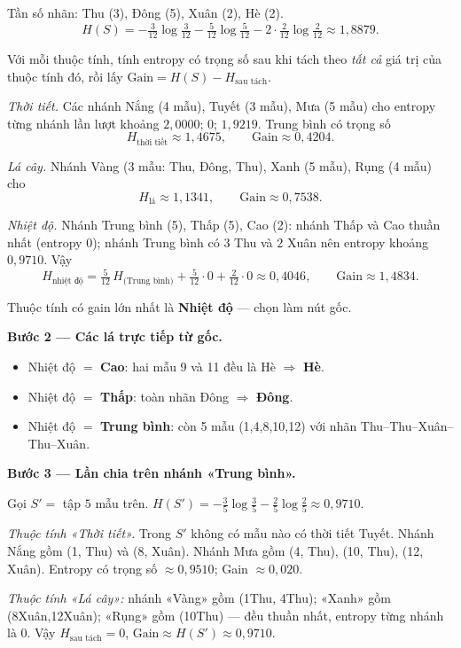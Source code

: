Tần số nhãn: Thu (3), Đông (5), Xuân (2), Hè (2).
\[
H(S)= -\tfrac{3}{12}\log\tfrac{3}{12}-\tfrac{5}{12}\log\tfrac{5}{12}
      -2\cdot\tfrac{2}{12}\log\tfrac{2}{12}
      \approx 1{,}8879.
\]

Với mỗi thuộc tính, tính entropy có trọng số sau khi tách theo \emph{tất cả} giá trị của thuộc tính đó, rồi lấy \(\text{Gain}=H(S)-H_{\text{sau tách}}\).

\emph{Thời tiết.} Các nhánh Nắng (4 mẫu), Tuyết (3 mẫu), Mưa (5 mẫu) cho entropy từng nhánh lần lượt khoảng \(2{,}0000\); \(0\); \(1{,}9219\). Trung bình có trọng số
\[
H_{\text{thời tiết}}\approx 1{,}4675,\qquad \text{Gain}\approx 0{,}4204.
\]

\emph{Lá cây.} Nhánh Vàng (3 mẫu: Thu, Đông, Thu), Xanh (5 mẫu), Rụng (4 mẫu) cho
\[
H_{\text{lá}}\approx 1{,}1341,\qquad \text{Gain}\approx 0{,}7538.
\]

\emph{Nhiệt độ.} Nhánh Trung bình (5), Thấp (5), Cao (2): nhánh Thấp và Cao thuần nhất (entropy \(0\)); nhánh Trung bình có \(3\) Thu và \(2\) Xuân nên entropy khoảng \(0{,}9710\).
Vậy
\[
H_{\text{nhiệt độ}}
=\tfrac{5}{12}\,H_{\text{(Trung bình)}}+\tfrac{5}{12}\cdot 0+\tfrac{2}{12}\cdot 0
\approx 0{,}4046,\qquad \text{Gain}\approx 1{,}4834.
\]

Thuộc tính có gain lớn nhất là \textbf{Nhiệt độ} --- chọn làm nút gốc.

\textbf{Bước 2 --- Các lá trực tiếp từ gốc.}
\begin{itemize}\setlength\itemsep{0pt}
  \item Nhiệt độ \(=\) \textbf{Cao}: hai mẫu 9 và 11 đều là Hè \(\Rightarrow\) \textbf{Hè}.
  \item Nhiệt độ \(=\) \textbf{Thấp}: toàn nhãn Đông \(\Rightarrow\) \textbf{Đông}.
  \item Nhiệt độ \(=\) \textbf{Trung bình}: còn 5 mẫu (1,4,8,10,12) với nhãn Thu--Thu--Xuân--Thu--Xuân.
\end{itemize}

\textbf{Bước 3 --- Lần chia trên nhánh «Trung bình».}

Gọi \(S'=\) tập \(5\) mẫu trên. \(H(S')=-\tfrac{3}{5}\log\tfrac{3}{5}-\tfrac{2}{5}\log\tfrac{2}{5}\approx 0{,}9710\).

\emph{Thuộc tính «Thời tiết».} Trong \(S'\) không có mẫu nào có thời tiết Tuyết. Nhánh Nắng gồm (1, Thu) và (8, Xuân). Nhánh Mưa gồm (4, Thu), (10, Thu), (12, Xuân). Entropy có trọng số \(\approx 0{,}9510\); Gain \(\approx 0{,}020\).

\emph{Thuộc tính «Lá cây»:} nhánh «Vàng» gồm (1Thu, 4Thu); «Xanh» gồm (8Xuân,12Xuân); «Rụng» gồm (10Thu) --- đều thuần nhất, entropy từng nhánh là \(0\). Vậy \(H_{\text{sau tách}}=0\), \(\text{Gain}\approx H(S')\approx 0{,}9710\).

